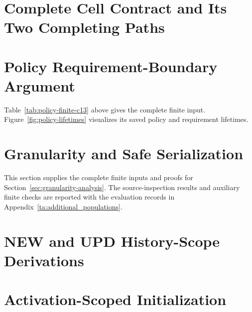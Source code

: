 \documentclass[11pt]{article}
\begin{document}
\section{Complete Cell Contract and Its Two Completing Paths}\label{ta:cell}



\FloatBarrier









\FloatBarrier
{}
\section{Policy Requirement-Boundary Argument}\label{ta:policy_interpretation}

Table~\ref{tab:policy-finite-c13} above gives the complete finite input. Figure~\ref{fig:policy-lifetimes} visualizes its saved policy and requirement lifetimes.

\FloatBarrier

\FloatBarrier
\section{Granularity and Safe Serialization}\label{ta:granularity_theory}
This section supplies the complete finite inputs and proofs for Section~\ref{sec:granularity-analysis}. The source-inspection results and auxiliary finite checks are reported with the evaluation records in Appendix~\ref{ta:additional_populations}.


\FloatBarrier

\section{NEW and UPD History-Scope Derivations}\label{ta:history_checks}

\FloatBarrier

\FloatBarrier
{}
\section{Activation-Scoped Initialization}\label{ta:activation_scope}




\FloatBarrier
\end{document}
